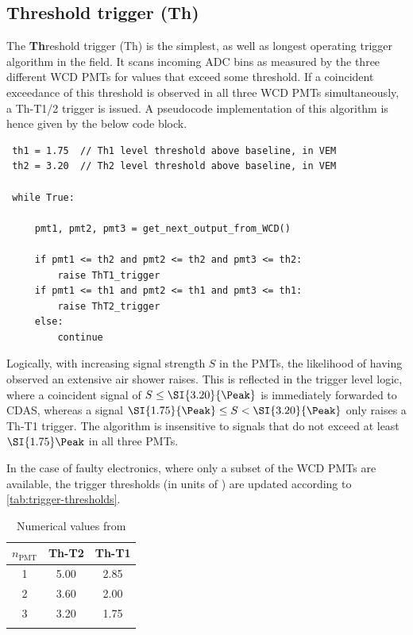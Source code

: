 \subsection{Threshold trigger (Th)}
\label{ssec:threshold-trigger}

The \textbf{Th}reshold trigger (Th) is the simplest, as well as longest operating trigger algorithm \cite{triggerGuide} in the field. It scans incoming 
ADC bins as measured by the three different WCD PMTs for values that exceed some threshold. If a coincident exceedance of this threshold is observed in 
all three WCD PMTs simultaneously, a Th-T1/2 trigger is issued. A pseudocode implementation of this algorithm is hence given by the below code block.

\begin{lstlisting}
 th1 = 1.75  // Th1 level threshold above baseline, in VEM   
 th2 = 3.20  // Th2 level threshold above baseline, in VEM  

 while True:

     pmt1, pmt2, pmt3 = get_next_output_from_WCD()

     if pmt1 <= th2 and pmt2 <= th2 and pmt3 <= th2:
         raise ThT1_trigger
     if pmt1 <= th1 and pmt2 <= th1 and pmt3 <= th1:
         raise ThT2_trigger
     else: 
         continue
\end{lstlisting}

Logically, with increasing signal strength $S$ in the PMTs, the likelihood of having observed an extensive air shower raises. This is reflected in the trigger 
level logic, where a coincident signal of $S\leq\SI{3.20}{\Peak}$ is immediately forwarded to CDAS, whereas a signal $\SI{1.75}{\Peak}\leq S<\SI{3.20}{\Peak}$ 
only raises a Th-T1 trigger. The algorithm is insensitive to signals that do not exceed at least $\SI{1.75}\Peak$ in all three PMTs.

In the case of faulty electronics, where only a subset of the WCD PMTs are available, the trigger thresholds (in units of \SI{}{\Peak}) are updated according to 
\autoref{tab:trigger-thresholds}.

\begin{table}[h]
	\begin{center}
	\caption{Numerical values from \cite{triggerSettings}}
	\begin{tabular*}{0.4\textwidth}{@{\extracolsep{\fill}} ccc}
		\toprule
		$n_\text{PMT}$ & Th-T2 & Th-T1 \\
		\midrule
		1 & 5.00 & 2.85 \\
		2 & 3.60 & 2.00 \\
		3 & 3.20 & 1.75 \\
		\bottomrule
	\label{tab:trigger-thresholds}
	\end{tabular*}
	\end{center}
\end{table}

